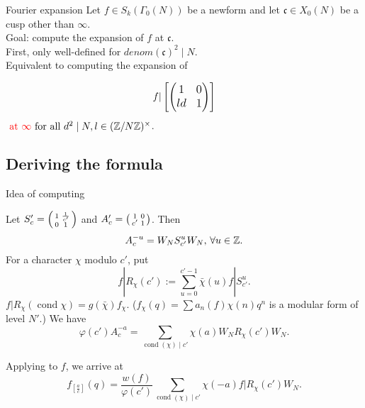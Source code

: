 \documentclass[handout]{beamer}
\newcommand{\fc}{\mathfrak{c}}
\DeclareMathOperator{\cond}{cond}
\begin{document}
\begin{frame}{Fourier expansion}
Let $f \in S_k(\Gamma_0(N))$ be a newform and let $\fc \in X_0(N)$ be a cusp other than $\infty$.  \\

Goal: compute the expansion of $f$ at $\fc$. \\ 

First, only well-defined for $denom(\fc)^2 \mid N$. \\ 

Equivalent to computing the expansion of 

$$\large{f | \left[\left( \begin{matrix}1&0\\ld&1 \end{matrix}\right)\right]}$$ 
$\textcolor{red}{\mbox{ at } \infty} \mbox{ for all } d^2 \mid N, l \in (\mathbb{Z}/N\mathbb{Z})^{\times}$.

\end{frame}

\subsection{Deriving the formula}

\begin{frame}{Idea of computing}

Let $S_c' = \left( \begin{smallmatrix}1&\frac{1}{c'}\\0&1\end{smallmatrix}\right)$ and $A_c' = \left( \begin{smallmatrix}1&0\\c'&1\end{smallmatrix}\right)$.  Then 
\[
	A_c^{-u} = W_N S_{c'}^u W_N, \, \forall u \in \mathbb{Z}. 
\]
For a character $\chi$ modulo $c'$, put 
\begin{equation*}
\label{formula: RS}
	f | R_\chi(c') := \sum_{u =0}^{c'-1} \bar{\chi}(u) f | S_{c'}^u.
\end{equation*}
$f|R_\chi(\cond \chi) = g(\bar{\chi})f_\chi$. ($f_\chi (q) = \sum a_n(f) \chi(n)  q^n$ is a modular form of level $N'$.)   We have \begin{equation} 
\label{formula}
	\varphi(c') A_c^{-a} = \sum_{\cond(\chi) \mid c'} \chi(a) W_N R_\chi(c') W_N. 
\end{equation}

Applying to $f$, we arrive at
\begin{equation} \label{expansion0}
	\boxed{f_{[\frac{a}{c}]} \left( q\right) = \frac{w(f) }{\varphi(c')}\sum_{\cond(\chi) \mid c'} \chi(-a) f| R_\chi(c')  W_N}. 
\end{equation}
\end{frame}
\end{document}
